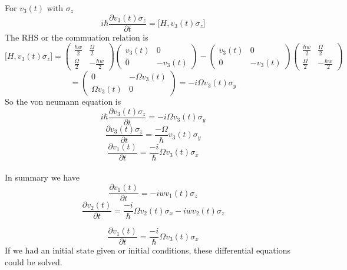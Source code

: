 \documentclass[12pt]{article}
\begin{document}
\begin{enumerate}
\begin{enumerate}
    For $v_3 (t)$ with $\sigma_z$ 
    $$ i \hbar \frac{\partial v_3 (t) \sigma_z}{\partial t} = \Big[H, v_3 (t) \sigma_z \Big] $$
    The RHS or the commuation relation is 
    $$ \Big[H, v_3 (t) \sigma_z \Big] = \left(\begin{array}{ccc} \frac{\hbar w}{2} & \frac{\Omega}{2} \\ \frac{\Omega}{2} & -\frac{\hbar w}{2} \end{array}\right) \left(\begin{array}{ccc} v_3 (t) &  0 \\ 0 & -v_3 (t) \end{array}\right)  - \left(\begin{array}{ccc} v_3 (t) & 0\\ 0 & -v_3 (t) \end{array}\right) \left(\begin{array}{ccc} \frac{\hbar w}{2} & \frac{\Omega}{2} \\ \frac{\Omega}{2} & -\frac{\hbar w}{2} \end{array}\right) $$
    $$ =  \left(\begin{array}{ccc} 0 & -\Omega v_3 (t) \\ \Omega v_3 (t) & 0 \end{array}\right) = -i \Omega v_3 (t) \sigma_y $$
    So the von neumann equation is 
    $$ i \hbar \frac{\partial v_3 (t) \sigma_z}{\partial t} = -i \Omega v_3 (t) \sigma_y $$ 
    $$  \frac{\partial v_3 (t) \sigma_z}{\partial t} = \frac{-\Omega}{\hbar} v_3 (t) \sigma_y$$ 
    $$ \frac{\partial v_1 (t)}{\partial t} = \frac{-i}{\hbar} \Omega v_3 (t) \sigma_x$$
    \\
    In summary we have 
    $$ \frac{\partial v_1 (t)}{\partial t} = -i w v_1 (t) \sigma_z $$
    $$ \frac{\partial v_2 (t)}{\partial t} = \frac{-i}{\hbar} \Omega v_2 (t) \sigma_x - iw v_2(t) \sigma_z $$

    $$ \frac{\partial v_1 (t)}{\partial t} = \frac{-i}{\hbar} \Omega v_3 (t) \sigma_x$$
    If we had an initial state given or initial conditions, these differential equations could be solved.

\end{enumerate}

\end{enumerate}
\end{document}
